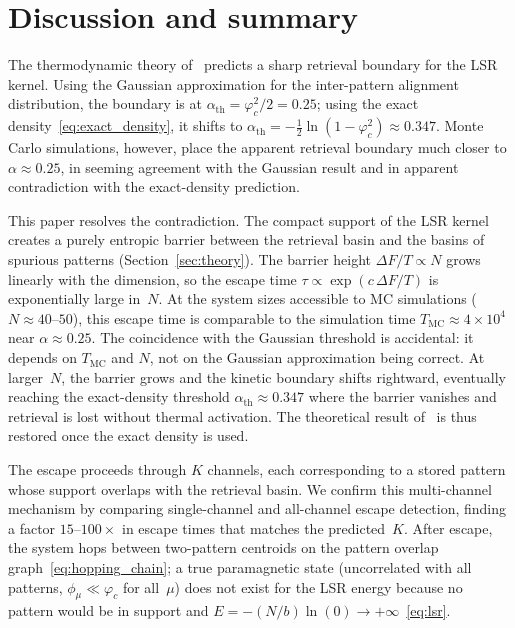 \documentclass[11pt]{article}
\begin{document}
\section{Discussion and summary}
\label{sec:discussion}

The thermodynamic theory of~\citet{icml2026theory} predicts a sharp retrieval boundary for the LSR kernel.  Using the Gaussian approximation for the inter-pattern alignment distribution, the boundary is at $\alpha_{\mathrm{th}} = \varphi_c^2/2 = 0.25$; using the exact density~\eqref{eq:exact_density}, it shifts to $\alpha_{\mathrm{th}} = -\tfrac{1}{2}\ln(1-\varphi_c^2) \approx 0.347$.  Monte Carlo simulations, however, place the apparent retrieval boundary much closer to $\alpha \approx 0.25$, in seeming agreement with the Gaussian result and in apparent contradiction with the exact-density prediction.

This paper resolves the contradiction.  The compact support of the LSR kernel creates a purely entropic barrier between the retrieval basin and the basins of spurious patterns (Section~\ref{sec:theory}).  The barrier height $\Delta F/T \propto N$ grows linearly with the dimension, so the escape time $\tau \propto \exp(c\,\Delta F/T)$ is exponentially large in~$N$.  At the system sizes accessible to MC simulations ($N \approx 40$--$50$), this escape time is comparable to the simulation time $T_{\mathrm{MC}} \approx 4 \times 10^4$ near $\alpha \approx 0.25$.  The coincidence with the Gaussian threshold is accidental: it depends on $T_{\mathrm{MC}}$ and $N$, not on the Gaussian approximation being correct.  At larger~$N$, the barrier grows and the kinetic boundary shifts rightward, eventually reaching the exact-density threshold $\alpha_{\mathrm{th}} \approx 0.347$ where the barrier vanishes and retrieval is lost without thermal activation.  The theoretical result of~\citet{icml2026theory} is thus restored once the exact density is used.

The escape proceeds through $K$ channels, each corresponding to a stored pattern whose support overlaps with the retrieval basin.  We confirm this multi-channel mechanism by comparing single-channel and all-channel escape detection, finding a factor $15$--$100\times$ in escape times that matches the predicted~$K$.  After escape, the system hops between two-pattern centroids on the pattern overlap graph~\eqref{eq:hopping_chain}; a true paramagnetic state (uncorrelated with all patterns, $\phi_\mu \ll \varphi_c$ for all~$\mu$) does not exist for the LSR energy because no pattern would be in support and $E = -(N/b)\ln(0) \to +\infty$~\eqref{eq:lsr}.
\end{document}
